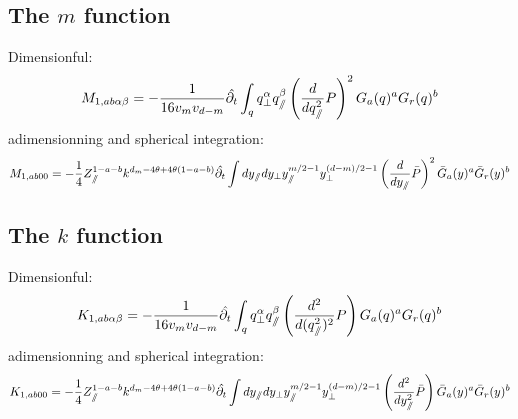 \subsection{The $m$ function}
Dimensionful:
\begin{equation}
M_{1,ab\alpha \beta} = -\frac{1}{16 v_m v_{d-m}} \hat{\partial_{t}} \int_q q_\perp^\alpha q_\sslash^\beta \left(\frac{d}{d q_\sslash^2} P\right)^2 G_a(q)^a G_r(q)^b
\end{equation}
adimensionning and spherical integration:
\begin{equation}
M_{1,ab00} = -\frac{1}{4} Z_\sslash^{1-a-b} k^{d_m - 4\theta + 4\theta(1-a-b)} \hat{\partial_{t}} \int dy_\sslash dy_\perp y_\sslash^{m/2-1} y_\perp^{(d-m)/2-1} \left(\frac{d}{d y_\sslash} \bar{P}\right)^2 \bar{G}_a(y)^a \bar{G}_r(y)^b
\end{equation}

\subsection{The $k$ function}
Dimensionful:
\begin{equation}
K_{1,ab\alpha \beta} = -\frac{1}{16 v_m v_{d-m}} \hat{\partial_{t}} \int_q q_\perp^\alpha q_\sslash^\beta \left(\frac{d^{2}}{d (q_\sslash^2)^{2}} P\right) G_a(q)^a G_r(q)^b
\end{equation}
adimensionning and spherical integration:
\begin{equation}
K_{1,ab00} = -\frac{1}{4} Z_\sslash^{1-a-b} k^{d_m - 4\theta + 4\theta(1-a-b)} \hat{\partial_{t}} \int dy_\sslash dy_\perp y_\sslash^{m/2-1} y_\perp^{(d-m)/2-1} \left(\frac{d^{2}}{d y_\sslash^{2}} \bar{P}\right) \bar{G}_a(y)^a \bar{G}_r(y)^b
\end{equation}